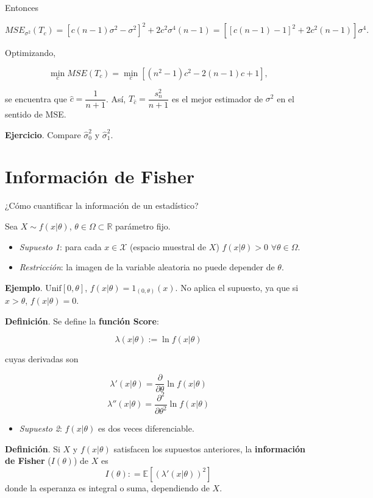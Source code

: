 \documentclass[
  12pt,
]{book}
\providecommand{\tightlist}{%
  \setlength{\itemsep}{0pt}\setlength{\parskip}{0pt}}
\begin{document}
Entonces

\[MSE_{\sigma^2}(T_c) = [c(n-1)\sigma^2-\sigma^2]^2+2c^2\sigma^4(n-1) = [[c(n-1)-1]^2+2c^2(n-1)]\sigma^4.\]

Optimizando,

\[\min_c MSE (T_c) = \min_c[(n^2-1)c^2-2(n-1)c+1],\]

se encuentra que \(\hat c = \dfrac 1{n+1}\). Así, \(T_{\hat c} = \dfrac{s_n^2}{n+1}\) es el mejor estimador de \(\sigma^2\) en el sentido de MSE.

\textbf{Ejercicio}. Compare \(\hat\sigma_0^2\) y \(\hat\sigma_1^2\).

\hypertarget{informaciuxf3n-de-fisher}{%
\section{Información de Fisher}\label{informaciuxf3n-de-fisher}}

¿Cómo cuantificar la información de un estadístico?

Sea \(X\sim f(x|\theta)\), \(\theta \in \Omega \subset \mathbb R\) parámetro fijo.

\begin{itemize}
\item
  \emph{Supuesto 1}: para cada \(x \in \mathcal X\) (espacio muestral de \(X\)) \(f(x|\theta)> 0\) \(\forall \theta \in \Omega\).
\item
  \emph{Restricción}: la imagen de la variable aleatoria no puede depender de \(\theta\).
\end{itemize}

\textbf{Ejemplo}. \(\text{Unif}[0,\theta]\), \(f(x|\theta) = 1_{(0,\theta)}(x)\). No aplica el supuesto, ya que si \(x>\theta\), \(f(x|\theta) = 0\).

\textbf{Definición}. Se define la \textbf{función Score}:

\[\lambda(x|\theta):=\ln f(x|\theta)\]

cuyas derivadas son

\[\lambda'(x|\theta) = \dfrac \partial{\partial \theta}\ln f(x|\theta)\]
\[\lambda''(x|\theta) = \dfrac {\partial^2}{\partial \theta^2}\ln f(x|\theta)\]

\begin{itemize}
\tightlist
\item
  \emph{Supuesto 2}: \(f(x|\theta)\) es dos veces diferenciable.
\end{itemize}

\textbf{Definición}. Si \(X\) y \(f(x|\theta)\) satisfacen los supuestos anteriores, la \textbf{información de Fisher} (\(I(\theta)\)) de \(X\) es
\[I(\theta): =\mathbb E[(\lambda'(x|\theta))^2]\]
donde la esperanza es integral o suma, dependiendo de \(X\).
\end{document}
